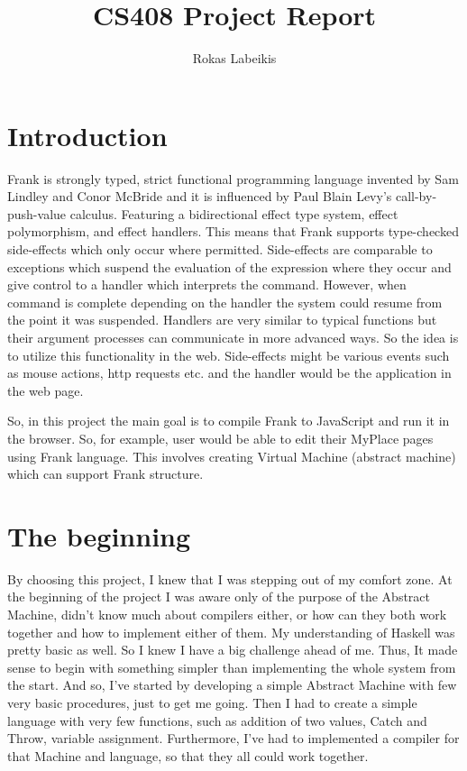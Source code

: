 \documentclass[12pt]{report}
\begin{document}
\title{CS408 Project Report}
\author{Rokas Labeikis}
\maketitle


\section{Introduction}

Frank is strongly typed, strict functional programming language invented by
Sam Lindley and Conor McBride and it is influenced by Paul Blain Levy’s
call-by-push-value calculus. Featuring  a bidirectional effect type system,
effect polymorphism, and effect handlers. This means that Frank supports
type-checked side-effects which only occur where permitted.
Side-effects are comparable to exceptions which suspend the evaluation of the
expression where they occur and give control to a handler which interprets
the command. However, when command is complete depending on the handler the
system could resume from the point it was suspended. Handlers are very similar
to typical functions but their argument processes can communicate in more
advanced ways. So the idea is to utilize this functionality in the web.
Side-effects might be various events such as mouse actions, http requests etc.
and the handler would be the application in the web page.

So, in this project the main goal is to compile Frank to JavaScript and run it
in the browser. So, for example, user would be able to edit their MyPlace pages
using Frank language. This involves creating Virtual Machine (abstract machine)
which can support Frank structure.

\section{The beginning}

By choosing this project, I knew that I was stepping out of my comfort zone.
At the beginning of the project I was aware only of the purpose of the Abstract
Machine, didn’t know much about compilers either, or how can they both work
together and how to implement either of them. My understanding of Haskell was
pretty basic as well. So I knew I have a big challenge ahead of me. Thus, It
made sense to begin with something simpler than implementing the whole system
from the start. And so, I’ve started by developing a simple Abstract Machine
with few very basic procedures, just to get me going. Then I had to create
a simple language with very few functions, such as addition of two values,
Catch and Throw, variable assignment. Furthermore,  I’ve had to implemented
a compiler for that Machine and language, so that they all could work together.
\end{document}
